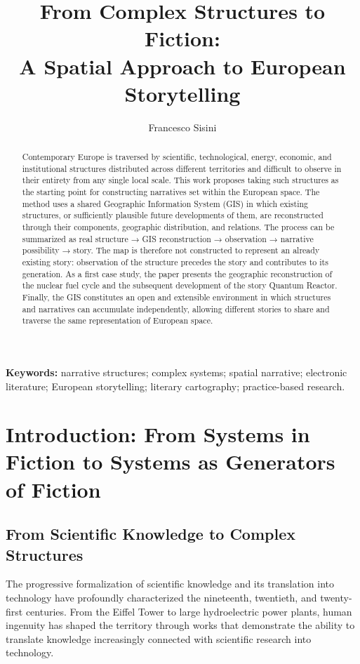\documentclass[11pt,a4paper]{article}
\title{From Complex Structures to Fiction:\\A Spatial Approach to European Storytelling}
\author{Francesco Sisini}
\date{}
\begin{document}
\maketitle

\begin{abstract}
Contemporary Europe is traversed by scientific, technological, energy, economic, and institutional structures distributed across different territories and difficult to observe in their entirety from any single local scale. This work proposes taking such structures as the starting point for constructing narratives set within the European space. The method uses a shared Geographic Information System (GIS) in which existing structures, or sufficiently plausible future developments of them, are reconstructed through their components, geographic distribution, and relations. The process can be summarized as real structure → GIS reconstruction → observation → narrative possibility → story. The map is therefore not constructed to represent an already existing story: observation of the structure precedes the story and contributes to its generation. As a first case study, the paper presents the geographic reconstruction of the nuclear fuel cycle and the subsequent development of the story Quantum Reactor. Finally, the GIS constitutes an open and extensible environment in which structures and narratives can accumulate independently, allowing different stories to share and traverse the same representation of European space.
\end{abstract}

\noindent\textbf{Keywords:} narrative structures; complex systems; spatial
narrative; electronic literature; European storytelling; literary cartography;
practice-based research.

\section{Introduction: From Systems in Fiction to Systems as Generators of Fiction}

\subsection{From Scientific Knowledge to Complex Structures}

The progressive formalization of scientific knowledge and its translation into technology have profoundly characterized the nineteenth, twentieth, and twenty-first centuries. From the Eiffel Tower to large hydroelectric power plants, human ingenuity has shaped the territory through works that demonstrate the ability to translate knowledge increasingly connected with scientific research into technology.
\end{document}
